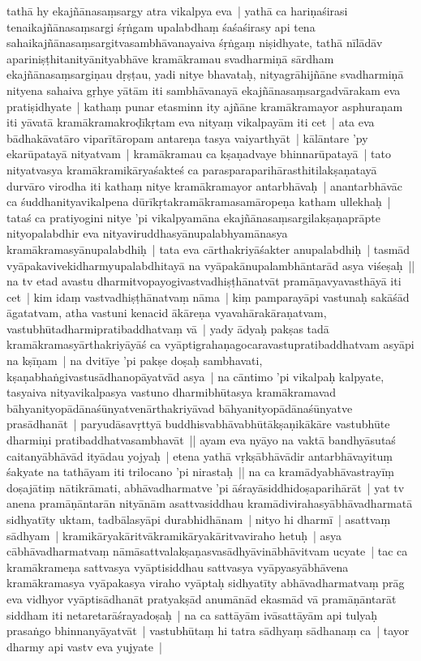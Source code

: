 \documentclass[article,12pt,a4paper]{memoir}
\newcommand{\persName}[1]{#1}
\begin{document}
	  \pstart tathā hy ekajñānasaṃsargy atra vikalpya eva | yathā ca hariṇaśirasi tenaikajñānasaṃsargi śṛṅgam upalabdhaṃ śaśaśirasy api tena sahaikajñānasaṃsargitvasambhāvanayaiva śṛṅgaṃ niṣidhyate, tathā nīlādāv apariniṣṭhitanityānityabhāve kramākramau svadharmiṇā sārdham ekajñānasaṃsargiṇau dṛṣṭau, yadi nitye bhavataḥ, nityagrāhijñāne svadharmiṇā nityena sahaiva gṛhye yātām iti sambhāvanayā ekajñānasaṃsargadvārakam eva pratiṣidhyate | kathaṃ punar etasminn ity ajñāne kramākramayor asphuraṇam iti yāvatā kramākramakroḍīkṛtam eva nityaṃ vikalpayām iti cet | ata eva bādhakāvatāro viparītāropam antareṇa tasya vaiyarthyāt | \label{thakur75-92.17} kālāntare 'py ekarūpatayā nityatvam | kramākramau ca kṣaṇadvaye bhinnarūpatayā | tato nityatvasya kramākramikāryaśakteś ca parasparaparihārasthitilakṣaṇatayā durvāro virodha iti kathaṃ nitye kramākramayor antarbhāvaḥ | anantarbhāvāc ca śuddhanityavikalpena dūrīkṛtakramākramasamāropeṇa katham ullekhaḥ | tataś ca pratiyogini nitye 'pi vikalpyamāna ekajñānasaṃsargilakṣaṇaprāpte nityopalabdhir eva nityaviruddhasyānupalabhyamānasya kramākramasyānupalabdhiḥ | tata eva cārthakriyāśakter anupalabdhiḥ | tasmād vyāpakavivekidharmyupalabdhitayā na vyāpakānupalambhāntarād asya viśeṣaḥ || \label{thakur75-92.25} na tv etad avastu dharmitvopayogivastvadhiṣṭhānatvāt pramāṇavyavasthāyā iti cet | kim idaṃ vastvadhiṣṭhānatvaṃ nāma | kiṃ pamparayāpi vastunaḥ sakāśād āgatatvam, atha vastuni kenacid ākāreṇa vyavahārakāraṇatvam, vastubhūtadharmipratibaddhatvaṃ vā | \label{thakur75-93.1} yady ādyaḥ pakṣas tadā kramākramasyārthakriyāyāś ca vyāptigrahaṇagocaravastupratibaddhatvam asyāpi na kṣīṇam | \label{thakur75-93.2} na dvitīye 'pi pakṣe doṣaḥ sambhavati, kṣaṇabhaṅgivastusādhanopāyatvād asya | \label{thakur75-93.3} na cāntimo 'pi vikalpaḥ kalpyate, tasyaiva nityavikalpasya vastuno dharmibhūtasya kramākramavad bāhyanityopādānaśūnyatvenārthakriyāvad bāhyanityopādānaśūnyatve prasādhanāt | paryudāsavṛttyā buddhisvabhāvabhūtākṣaṇikākāre vastubhūte dharmiṇi pratibaddhatvasambhavāt || \label{thakur75-93.7} ayam eva nyāyo na vaktā bandhyāsutaś caitanyābhāvād ityādau yojyaḥ | etena yathā vṛkṣābhāvādir antarbhāvayituṃ śakyate na tathāyam iti \persName{trilocano} 'pi nirastaḥ || \label{thakur75-93.10} na ca kramādyabhāvastrayīṃ doṣajātiṃ nātikrāmati, abhāvadharmatve 'pi āśrayāsiddhidoṣaparihārāt | \label{thakur75-93.11} yat tv anena pramāṇāntarān nityānām asattvasiddhau kramādivirahasyābhāvadharmatā sidhyatīty uktam, tadbālasyāpi durabhidhānam | nityo hi dharmī | asattvaṃ sādhyam | kramikāryakāritvākramikāryakāritvaviraho hetuḥ | asya cābhāvadharmatvaṃ nāmāsattvalakṣaṇasvasādhyāvinābhāvitvam ucyate | tac ca kramākrameṇa sattvasya vyāptisiddhau sattvasya vyāpyasyābhāvena kramākramasya vyāpakasya viraho vyāptaḥ sidhyatīty abhāvadharmatvaṃ prāg eva vidhyor vyāptisādhanāt pratyakṣād anumānād ekasmād vā pramāṇāntarāt siddham iti netaretarāśrayadoṣaḥ | \label{thakur75-93.18} na ca sattāyām ivāsattāyām api tulyaḥ prasaṅgo bhinnanyāyatvāt | vastubhūtaṃ hi tatra sādhyaṃ sādhanaṃ ca | tayor dharmy api vastv eva yujyate | \label{thakur75-93.19} 
\end{document}

